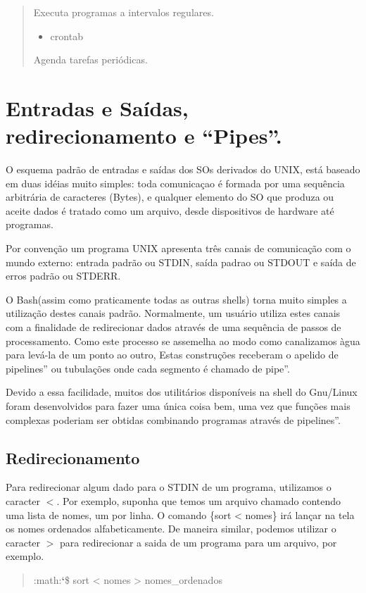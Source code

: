 \documentclass[a4paper,10pt,brazil]{sphinxmanual}
\begin{document}
\begin{quote}
\begin{description}
\begin{itemize}
\end{itemize}

Executa programas a intervalos regulares.
\begin{itemize}
\item {} 
crontab

\end{itemize}

Agenda tarefas periódicas.

\end{description}
\end{quote}


\section{Entradas e Saídas, redirecionamento e ``Pipes''.}
\label{bash:entradas-e-saidas-redirecionamento-e-pipes}
O esquema padrão de entradas e saídas dos SOs derivados do UNIX,
está baseado em duas idéias muito simples: toda comunicaçao é
formada por uma sequência arbitrária de caracteres (Bytes), e
qualquer elemento do SO que produza ou aceite dados é tratado como
um arquivo, desde dispositivos de hardware até programas.

Por convenção um programa UNIX apresenta três canais de comunicação
com o mundo externo: entrada padrão ou STDIN, saída padrao ou
STDOUT e saída de erros padrão ou STDERR.

O Bash(assim como praticamente todas as outras shells) torna muito
simples a utilização destes canais padrão. Normalmente, um usuário
utiliza estes canais com a finalidade de redirecionar dados através
de uma sequência de passos de processamento. Como este processo se
assemelha ao modo como canalizamos àgua para levá-la de um ponto ao
outro, Estas construções receberam o apelido de pipelines'' ou
tubulações onde cada segmento é chamado de pipe''.

Devido a essa facilidade, muitos dos utilitários disponíveis na
shell do Gnu/Linux foram desenvolvidos para fazer uma única coisa
bem, uma vez que funções mais complexas poderiam ser obtidas
combinando programas através de pipelines''.


\subsection{Redirecionamento}
\label{bash:redirecionamento}
Para redirecionar algum dado para o STDIN de um programa,
utilizamos o caracter $<$. Por exemplo, suponha que temos
um arquivo chamado  contendo uma lista de nomes, um por
linha. O comando \{sort \textless{} nomes\} irá lançar na tela os nomes
ordenados alfabeticamente. De maneira similar, podemos utilizar o
caracter $>$ para redirecionar a saida de um programa para
um arquivo, por exemplo.
\begin{quote}

:math:{\color{red}\bfseries{}{}`}\$ sort \textless{} nomes \textgreater{} nomes\_ordenados
\end{quote}
\end{document}
